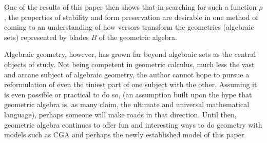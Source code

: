 \documentclass{birkjour}
\theoremstyle{definition}
\theoremstyle{remark}
\numberwithin{equation}{section}
\begin{document}
One of the results of this paper then shows that in searching for such a function
$\rho$, the properties of stability and form preservation are desirable in one
method of coming to
an understanding of how versors transform the geometries
(algebraic sets) represented by blades $B$ of the geometric algebra.

Algebraic geometry, however, has grown far beyond
algebraic sets as the central objects of study.  Not being competent in geometric calculus,
much less the vast and arcane subject of algebraic geometry, the author cannot hope to pursue
a reformulation of even the tiniest part of one subject with the other.  Assuming it
is even possible or practical to do so, (an assumption built upon the hype that
geometric algebra is, as many claim, the ultimate and universal mathematical language),
perhaps someone will make roads in that direction.
Until then, geometric algebra continues to offer fun and interesting ways to do geometry
with models such as CGA and perhaps the newly established model of this paper.

\nocite{Dorst07}
\nocite{Sobczyk12}



\end{document}
